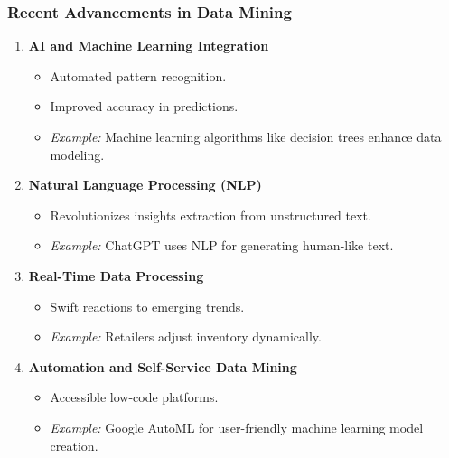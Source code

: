 \documentclass[aspectratio=169]{beamer}
\begin{document}
\begin{frame}[fragile]
    \frametitle{Recent Advancements in Data Mining}
    
    \begin{enumerate}
        \item \textbf{AI and Machine Learning Integration}
            \begin{itemize}
                \item Automated pattern recognition.
                \item Improved accuracy in predictions.
                \item \textit{Example:} Machine learning algorithms like decision trees enhance data modeling.
            \end{itemize}
        
        \item \textbf{Natural Language Processing (NLP)}
            \begin{itemize}
                \item Revolutionizes insights extraction from unstructured text.
                \item \textit{Example:} ChatGPT uses NLP for generating human-like text.
            \end{itemize}

        \item \textbf{Real-Time Data Processing}
            \begin{itemize}
                \item Swift reactions to emerging trends.
                \item \textit{Example:} Retailers adjust inventory dynamically.
            \end{itemize}
        
        \item \textbf{Automation and Self-Service Data Mining}
            \begin{itemize}
                \item Accessible low-code platforms.
                \item \textit{Example:} Google AutoML for user-friendly machine learning model creation.
            \end{itemize}
    \end{enumerate}
\end{frame}
\end{document}
